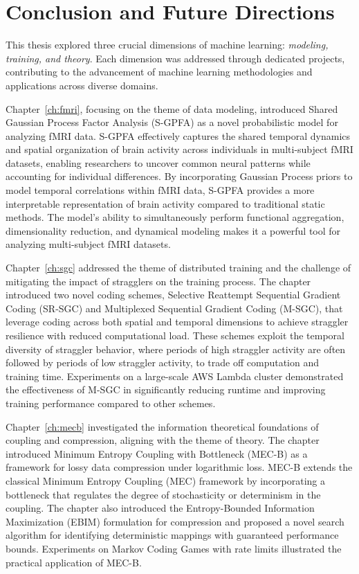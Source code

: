 \chapter{Conclusion and Future Directions}\label{ch:conclusion}

This thesis explored three crucial dimensions of machine learning: \textit{modeling, training, and theory}. Each dimension was addressed through dedicated projects, contributing to the advancement of machine learning methodologies and applications across diverse domains.

Chapter~\ref{ch:fmri}, focusing on the theme of data modeling, introduced Shared Gaussian Process Factor Analysis (S-GPFA) as a novel probabilistic model for analyzing fMRI data. S-GPFA effectively captures the shared temporal dynamics and spatial organization of brain activity across individuals in multi-subject fMRI datasets, enabling researchers to uncover common neural patterns while accounting for individual differences. By incorporating Gaussian Process priors to model temporal correlations within fMRI data, S-GPFA provides a more interpretable representation of brain activity compared to traditional static methods. The model's ability to simultaneously perform functional aggregation, dimensionality reduction, and dynamical modeling makes it a powerful tool for analyzing multi-subject fMRI datasets.

Chapter~\ref{ch:sgc} addressed the theme of distributed training and the challenge of mitigating the impact of stragglers on the training process. The chapter introduced two novel coding schemes, Selective Reattempt Sequential Gradient Coding (SR-SGC) and Multiplexed Sequential Gradient Coding (M-SGC), that leverage coding across both spatial and temporal dimensions to achieve straggler resilience with reduced computational load. These schemes exploit the temporal diversity of straggler behavior, where periods of high straggler activity are often followed by periods of low straggler activity, to trade off computation and training time. Experiments on a large-scale AWS Lambda cluster demonstrated the effectiveness of M-SGC in significantly reducing runtime and improving training performance compared to other schemes.

Chapter~\ref{ch:mecb} investigated the information theoretical foundations of coupling and compression, aligning with the theme of theory. The chapter introduced Minimum Entropy Coupling with Bottleneck (MEC-B) as a framework for lossy data compression under logarithmic loss. MEC-B extends the classical Minimum Entropy Coupling (MEC) framework by incorporating a bottleneck that regulates the degree of stochasticity or determinism in the coupling. The chapter also introduced the Entropy-Bounded Information Maximization (EBIM) formulation for compression and proposed a novel search algorithm for identifying deterministic mappings with guaranteed performance bounds. Experiments on Markov Coding Games with rate limits illustrated the practical application of MEC-B.

